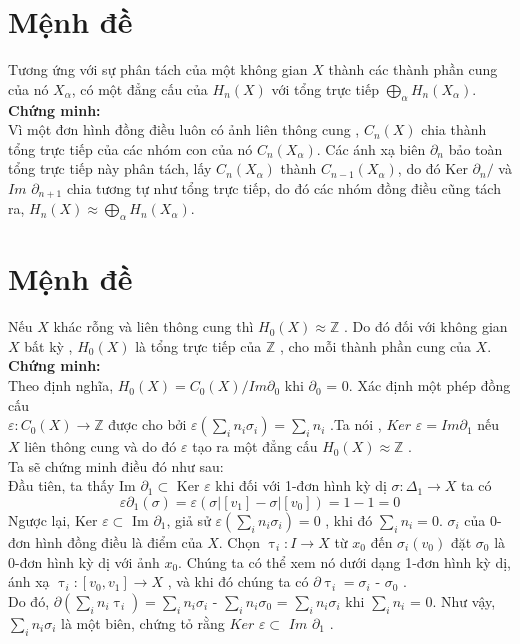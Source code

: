 \section{Mệnh đề}
\indent Tương ứng với sự phân tách của một không gian \(X\) thành các thành phần cung của nó \(X_{\alpha}\), có một đẳng cấu của \(H_n(X)\) với tổng trực tiếp \(\bigoplus_{\alpha}H_n(X_{\alpha})\). \\
\textbf{Chứng minh:} \\
\indent Vì một đơn hình đồng điều luôn có ảnh liên thông cung , \(C_n(X)\) chia thành tổng trực tiếp của các nhóm con của nó \(C_n(X_{\alpha})\). Các ánh xạ biên \(\partial_n\) bảo toàn tổng trực tiếp này phân tách, lấy \(C_n(X_{\alpha})\) thành \(C_{n−1} (X_{\alpha})\), do đó Ker \(\partial_n / \) và \(Im\) \(\partial_{n+1}\) chia tương tự như tổng trực tiếp, do đó các nhóm đồng điều cũng tách ra, \(H_n(X) \approx \bigoplus_{\alpha}H_n(X_{\alpha})\).


\section{Mệnh đề}
\indent Nếu \(X\) khác rỗng và liên thông cung thì \(H_0(X) \approx \mathds{Z} \) . Do đó đối với không gian \(X\) bất kỳ , \(H_0 (X)\) là tổng trực tiếp của  \(\mathds{Z}\) , cho mỗi thành phần cung của \(X\). \\
\textbf{Chứng minh: } \\
\indent Theo định nghĩa, \(H_0(X) = C_0(X)/Im\partial_0\)  khi  \(\partial_0\) = 0. Xác định một phép đồng cấu \\ \(\varepsilon : C_0(X) \rightarrow \mathds{Z} \) được cho bởi \(\varepsilon(\sum_{i}n_{i}\sigma_i) = \sum_{i}n_i\) .Ta nói , \(Ker\) \(\varepsilon = Im \partial_1\) nếu \(X\) liên thông cung  và do đó \(\varepsilon\) tạo ra một đẳng cấu \(H_0 (X) \approx \mathds{Z}\) . \\
\indent Ta sẽ chứng minh điều đó như sau: \\
Đầu tiên, ta thấy Im \(\partial_1 \subset\) Ker \(\varepsilon\)  khi đối với 1-đơn hình kỳ dị \(\sigma: \Delta
_1 \rightarrow X\) ta có
\[\varepsilon \partial_1(\sigma) = \varepsilon(\sigma|[v_1] - \sigma|[v_0]) = 1-1 = 0\]
Ngược lại, Ker \(\varepsilon \subset \) Im \(\partial_1\), giả sử \(\varepsilon(\sum_{i}n_{i}\sigma_i)=0\) , khi đó \(\sum_{i}n_i=0\). \(\sigma_i\) của 0-đơn hình đồng điều là điểm của \(X\). Chọn \(\uptau_i: I \rightarrow X\) từ \(x_0\) đến \(\sigma_i(v_0)\) đặt \(\sigma_0\) là 0-đơn hình kỳ dị với ảnh \(x_0\). Chúng ta có thể xem nó dưới dạng 1-đơn hình kỳ dị, ánh xạ \(\uptau_i : [v_0 , v_1]\rightarrow X\) , và khi đó chúng ta có \(\partial \uptau_i = \sigma_i\) - \(\sigma_0\) . \\
Do đó, \(\partial(\sum_{i}n_{i}\uptau_i) = \sum_{i}n_{i}\sigma_i\) - \(\sum_{i}n_{i}\sigma_0\) =  \(\sum_{i}n_{i}\sigma_i\)  khi \(\sum_{i}n_{i}\) = 0. Như vậy, \(\sum_{i}n_{i}\sigma_i\) là một biên, chứng tỏ rằng \(Ker\) \(\varepsilon \subset \) \(Im\) \(\partial_1\) . \\

